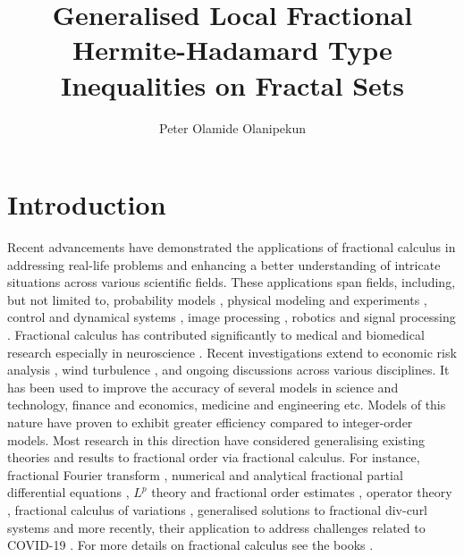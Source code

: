 \documentclass[10pt]{article}
\title{Generalised Local Fractional Hermite-Hadamard Type Inequalities on Fractal Sets }
\author{
Peter Olamide Olanipekun }
\date{}
\begin{document}
\sloppy
\maketitle



\section{Introduction}

Recent advancements have demonstrated the applications of fractional calculus in addressing real-life problems and enhancing a better understanding of intricate situations across various scientific fields. These applications span  fields, including, but not limited to, probability models \cite{oraby, lau}, physical modeling and experiments \cite{pot, boh, ciu}, control and dynamical systems \cite{liy, du, feliu}, image processing \cite{tian, pu}, robotics and signal processing \cite{gonz, dua}. Fractional calculus has contributed significantly to medical and biomedical research especially in neuroscience \cite{ris, kara, ingo, shi, pinto1, pinto2, val}. Recent investigations extend to economic risk analysis \cite{ro}, wind turbulence \cite{haj}, and ongoing discussions across various disciplines.  
It has been used to improve the accuracy of several models in science and technology, finance and economics, medicine and engineering etc. Models of this nature have proven to exhibit greater efficiency compared to integer-order models. Most research in this direction have considered generalising existing theories and results to fractional order via fractional calculus. For instance, fractional Fourier transform \cite{alie}, numerical and analytical fractional partial differential equations \cite{owo, rod}, $L^p$ theory and fractional order estimates \cite{muc},  operator theory \cite{kra}, fractional calculus of variations \cite{alme, del}, generalised solutions to fractional div-curl systems \cite{delg}  and more recently, their application to address challenges related to COVID-19 \cite{pand}. For more details on fractional calculus see the books \cite{old, miller}. 
\end{document}
